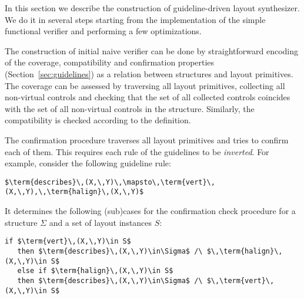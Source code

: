 
In this section we describe the construction of guideline-driven layout synthesizer. We do it in several steps starting
from the implementation of the simple functional verifier and performing a few optimizations.

The construction of initial naive verifier can be done
by straightforward encoding of the coverage, compatibility and confirmation properties (Section~\ref{sec:guidelines}) as a relation between structures and layout primitives.
The coverage can be assessed by traversing all layout primitives, collecting all non-virtual controls and
checking that the set of all collected controls coincides with the set of all non-virtual controls in the structure.
Similarly, the compatibility is checked according to the definition.

The confirmation procedure traverses all layout primitives and tries to confirm each of them. This requires each
rule of the guidelines to be \emph{inverted}. For example, consider the following guideline rule:

\begin{lstlisting}[language=ocanren,basicstyle=\small]
   $\term{describes}\,(X,\,Y)\,\mapsto\,\term{vert}\,(X,\,Y),\,\term{halign}\,(X,\,Y)$
\end{lstlisting}

It determines the following (sub)cases for the confirmation check procedure for a structure $\Sigma$ and
a set of layout instances $S$:

\begin{lstlisting}[language=ocanren,basicstyle=\small]
   if $\term{vert}\,(X,\,Y)\in S$
   then $\term{describes}\,(X,\,Y)\in\Sigma$ /\ $\,\term{halign}\,(X,\,Y)\in S$
   else if $\term{halign}\,(X,\,Y)\in S$
   then $\term{describes}\,(X,\,Y)\in\Sigma$ /\ $\,\term{vert}\,(X,\,Y)\in S$
\end{lstlisting}

